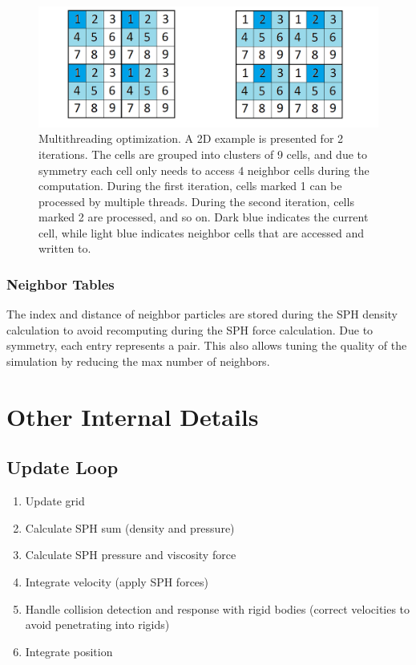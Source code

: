 \documentclass[]{article}
\begin{document}
			\begin{figure}[ht]
			  \centering
				\includegraphics[width=6.0in]{images/CellGrouping}
				\caption{Multithreading optimization. A 2D example is presented for 2 iterations. The cells are grouped
				into clusters of 9 cells, and due to symmetry each cell only needs to access 4 neighbor cells during 
				the computation. During the first iteration, cells marked 1 can be processed by multiple threads. During
				the second iteration, cells marked 2 are processed, and so on. Dark blue indicates the current cell,
				while light blue indicates neighbor cells that are accessed and written to. }
			\end{figure}
		\subsubsection{Neighbor Tables}
			The index and distance of neighbor particles are stored during the SPH density calculation to avoid
			recomputing during the SPH force calculation. Due to symmetry, each entry represents a pair.
			This also allows tuning the quality of the simulation by reducing the max number of neighbors.

\pagebreak			
\section{Other Internal Details}
	\subsection{Update Loop}
		\begin{enumerate}
			\item Update grid
			\item Calculate SPH sum (density and pressure)
			\item Calculate SPH pressure and viscosity force
			\item Integrate velocity (apply SPH forces)
			\item Handle collision detection and response with rigid bodies (correct velocities to avoid penetrating into rigids)
			\item Integrate position
		\end{enumerate}
	
\end{document}
